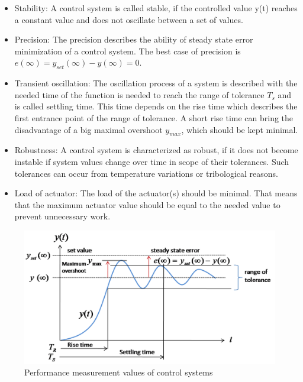 \begin{itemize}

\item Stability: A control system is called stable, if the controlled value y(t)
reaches a constant value and does not oscillate between a set of values.


\item Precision: The precision describes the ability of steady state error
minimization of a control system. The best case of precision is
\ensuremath{e(\infty)=y_{set}(\infty)-y(\infty)=0}.

\item Transient oscillation: The oscillation process of a system is described
with the needed time of the function is needed to reach the range of tolerance
\ensuremath{T_s} and is called settling time. This time depends on the rise time
which describes the first entrance point of the range of tolerance. A short rise time
can bring the disadvantage of a big maximal overshoot \ensuremath{y_{max}},
which should be kept minimal.

\item Robustness: A control system is characterized as robust, if it does not
become instable if system values change over time in scope of their tolerances.
Such tolerances can occur from temperature variations or tribological reasons.

\item Load of actuator: The load of the actuator(s) should be minimal. That means
that the maximum actuator value should be equal to the needed value to prevent
unnecessary work.
\end{itemize}

\begin{figure}[H]
	\centering
		\includegraphics[width=1\textwidth]{graphic/ControlSystemCharacteristics.png}
\caption{Performance measurement values of control systems}
	\label{fig:ControlSystemCharacteristics.png}
\end{figure}



